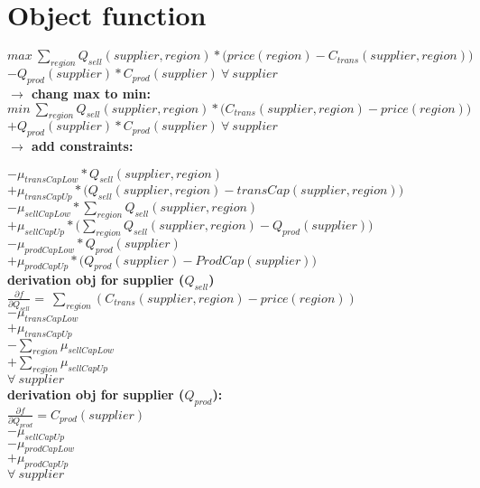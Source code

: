 \documentclass{article}
\begin{document}
\hfill\\ 
\hfill\\
\section*{Object function}
\quad$ max\:\sum_{region} Q_{sell}(supplier, region) *\Big(price(region) - C_{trans}(supplier,region)\Big) $\\
\quad$- Q_{prod}(supplier)*C_{prod}(supplier)\:\forall\: supplier $\\

\textbf{$\rightarrow$ chang max to min:}\\

\quad$ min\:\sum_{region} Q_{sell}(supplier, region) *\Big(C_{trans}(supplier,region) - price(region)\Big) $\\
\quad$+ Q_{prod}(supplier)*C_{prod}(supplier)\:\forall\: supplier$ \\

\textbf{$\rightarrow$ add constraints:}

\quad$ - \mu_{transCapLow} * Q_{sell}(supplier, region)$\\
\quad$ + \mu_{transCapUp} * \Big( Q_{sell}(supplier, region) - transCap(supplier, region) \Big)$\\
\quad$ - \mu_{sellCapLow} * \sum_{region} Q_{sell}(supplier, region)$\\
\quad$ + \mu_{sellCapUp}*\Big( \sum_{region} Q_{sell}(supplier, region) - Q_{prod}(supplier)\Big)$\\
\quad$ - \mu_{prodCapLow} * Q_{prod}(supplier)$\\
\quad$ + \mu_{prodCapUp}*\Big(Q_{prod}(supplier) - ProdCap(supplier)\Big)$\\


\textbf{derivation obj for supplier ($Q_{sell}$)}\\
\quad$\frac{\partial f}{\partial Q_{sell}} = \:\sum_{region} (C_{trans}(supplier,region) - price(region))$\\
\quad$ - \mu_{transCapLow}$\\
\quad$ + \mu_{transCapUp} $\\
\quad$ - \sum_{region} \mu_{sellCapLow} $\\
\quad$ + \sum_{region} \mu_{sellCapUp}$\\

\quad$\forall \:supplier$\\

\textbf{derivation obj for supplier ($Q_{prod}$):}\\
\quad$\frac{\partial f}{\partial Q_{prod}} = C_{prod}(supplier)\:$\\
\quad$ - \mu_{sellCapUp}$\\
\quad$ - \mu_{prodCapLow}$\\
\quad$ + \mu_{prodCapUp}$\\

\quad$\forall \:supplier$\\
\end{document}
